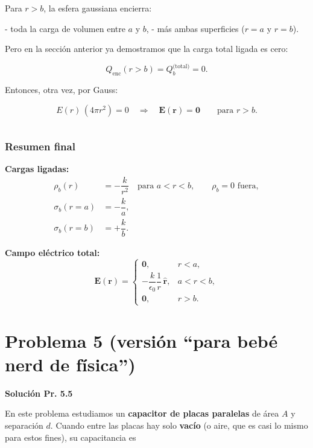 \documentclass{article}
\begin{document}
Para $r>b$, la esfera gaussiana encierra:

- toda la carga de volumen entre $a$ y $b$,  
- más ambas superficies ($r=a$ y $r=b$).

Pero en la sección anterior ya demostramos que la carga total ligada es cero:

\[
Q_{\text{enc}}(r>b) = Q_{b}^{\text{(total)}} = 0.
\]

Entonces, otra vez, por Gauss:

\[
E(r)\,(4\pi r^{2}) = 0
\quad\Rightarrow\quad
\mathbf{E}(\mathbf{r}) = \mathbf{0}
\qquad\text{para } r>b.
\]

\begin{equation}
\label{eq:E-outer-final}
\end{equation}

\subsubsection*{Resumen final}

\textbf{Cargas ligadas:}
\begin{align}
\rho_{b}(r) &= -\dfrac{k}{r^{2}} \quad \text{para } a<r<b,
\qquad \rho_{b}=0 \text{ fuera},\\[4pt]
\sigma_{b}(r=a) &= -\dfrac{k}{a},\\[4pt]
\sigma_{b}(r=b) &= +\dfrac{k}{b}.
\end{align}

\textbf{Campo eléctrico total:}
\begin{equation}
\mathbf{E}(\mathbf{r}) =
\begin{cases}
\mathbf{0}, & r<a,\\[4pt]
-\dfrac{k}{\epsilon_{0}}\dfrac{1}{r}\,\hat{\mathbf{r}}, & a<r<b,\\[6pt]
\mathbf{0}, & r>b.
\end{cases}
\label{eq:E-piecewise-shell}
\end{equation}


\section{Problema 5 (versión “para bebé nerd de física”)}

\textcolor{Cinnabar}{\textbf{Solución Pr. 5.5}} \vspace{0.4cm}

En este problema estudiamos un \textbf{capacitor de placas paralelas} de área $A$ y separación $d$.  
Cuando entre las placas hay solo \textbf{vacío} (o aire, que es casi lo mismo para estos fines), su capacitancia es
\end{document}
